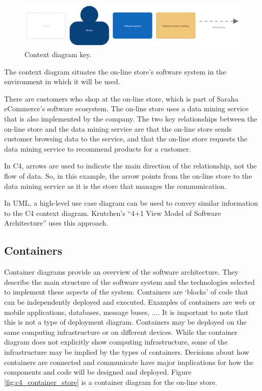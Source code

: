 \begin{figure}[h]
    \centering
    \includegraphics[trim=20 15 20 15,clip,width=\textwidth]{images/c4/context_diagram-key.png}
    \caption{Context diagram key.}
    \label{fig:c4_context_key}
\end{figure}

\noindent
The context diagram situates the on-line store's software system in the environment in which it will be used.

There are customers who shop at the on-line store, which is part of Saraha eCommerce's software ecosystem.
The on-line store uses a data mining service that is also implemented by the company.
The two key relationships between the on-line store and the data mining service are 
that the on-line store sends customer browsing data to the service,
and that the on-line store requests the data mining service to recommend products for a customer.

In C4, arrows are used to indicate the main direction of the relationship, not the flow of data.
So, in this example, the arrow points from the on-line store to the data mining service as it is the store that manages the communication.

In UML, a high-level use case diagram can be used to convey similar information to the C4 context diagram.
Krutchen's ``4+1 View Model of Software Architecture'' \cite{4+1-model} uses this approach.

\subsection{Containers}
Container diagrams provide an overview of the software architecture.
They describe the main structure of the software system and the technologies selected to implement these aspects of the system.
Containers are `blocks' of code that can be independently deployed and executed.
Examples of containers are web or mobile applications, databases, message buses, ....
It is important to note that this is not a type of deployment diagram.
Containers may be deployed on the same computing infrastructure or on different devices.
While the container diagram does not explicitly show computing infrastructure, some of the infrastructure may be implied by the types of containers.
Decisions about how containers are connected and communicate have major implications for how the components and code will be designed and deployed.
Figure \ref{fig:c4_container_store} is a container diagram for the on-line store.

